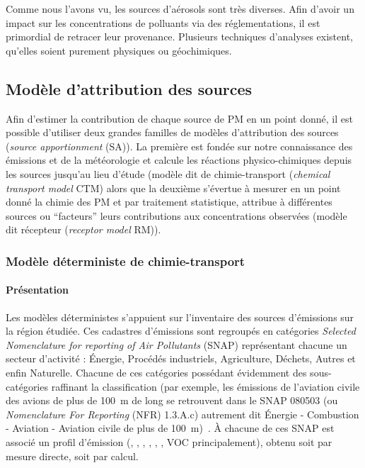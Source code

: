 Comme nous l'avons vu, les sources d'aérosols sont très diverses.
Afin d'avoir un impact sur les concentrations de polluants via des
réglementations, il est primordial de
retracer leur provenance. Plusieurs techniques d'analyses existent, qu'elles soient purement
physiques ou géochimiques.

\subsection{Modèle d'attribution des sources}%
\label{sec:source_apportionment_model}

Afin d'estimer la contribution de chaque source de PM en un point donné, il est possible
d'utiliser deux grandes familles de modèles d'attribution des sources (\textit{source
apportionment} (SA)). La première est fondée sur notre connaissance des
émissions et de la météorologie et calcule les réactions physico-chimiques depuis les
sources jusqu'au lieu d'étude (modèle dit de chimie-transport (\textit{chemical transport
model} CTM) alors que la deuxième s'évertue à mesurer en un point donné
la chimie des PM et par traitement statistique, attribue à différentes sources ou
``facteurs'' leurs contributions aux concentrations observées (modèle dit récepteur
(\textit{receptor model} RM)).

\subsubsection{Modèle déterministe de chimie-transport}%
\label{ssub:modele_deterministe_de_chimietransport}

\paragraph{Présentation}%
\label{par:presentation}

Les modèles déterministes s'appuient sur l'inventaire des sources d'émissions sur la
région étudiée. Ces cadastres d'émissions sont regroupés en catégories \textit{Selected
Nomenclature for reporting of Air Pollutants} (SNAP) représentant chacune un secteur
d'activité : Énergie, Procédés industriels, Agriculture, Déchets, Autres et enfin
Naturelle.
Chacune de ces catégories possédant évidemment des sous-catégories raffinant la
classification (par exemple, les émissions de l'aviation civile des avions de plus de \SI{100}{m} de
long se retrouvent dans le SNAP 080503 (ou \textit{Nomenclature For Reporting} (NFR)
1.3.A.c) autrement dit Énergie - Combustion - Aviation - Aviation civile de plus de
\SI{100}{m})~\autocite{europeanenvironmentagencyEMEP2019}.
À chacune de ces SNAP est associé un profil d'émission (, , , , \PMdix, \PMdc,
VOC principalement), obtenu soit par mesure directe, soit par calcul.

